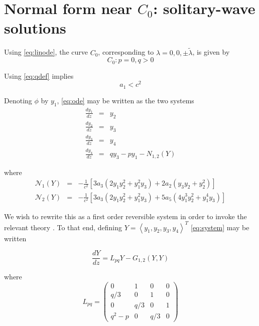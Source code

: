 \section{Normal form near $C_0$: solitary-wave solutions}

Using \eqref{eq:linode}, the curve $C_0$, corresponding to $\lambda = 0,0,\pm \tilde{ \lambda } $, is given by
\begin{equation}
C_0: { p=0, q > 0 }
\end{equation}

Using \eqref{eq:qdef} implies
\begin{equation}
a_1 < c^2 
\end{equation}

Denoting $\phi$ by $y_1$, \eqref{eq:ode} may be written as the two systems
\begin{subequations}\label{eq:system}
\begin{eqnarray}
\frac{d y_1 }{d z} &=& y_2 \\
\frac{d y_2 }{d z} &=& y_3 \\
\frac{d y_3 }{d z} &=& y_4 \\
\frac{d y_4 }{d z} &=& q y_3 - p y_1 - N_{1,2}(Y)
\end{eqnarray}
\end{subequations}

where
\begin{subequations}
\begin{eqnarray}
\mathcal{N}_1\left(Y\right) &=& - \frac{1}{c^2}\left[  3 a_3 \left( 2 y_1 y_2^2 + y_1^2 y_3 \right) + 2 a_2\left( y_3 y_2 + y_2^2\right) \right] \\
\mathcal{N}_2\left(Y\right) &=& - \frac{1}{c^2}\left[ 3 a_3 \left( 2 y_1 y_2^2 + y_1^2 y_3\right) + 5 a_5 \left( 4 y_1^3 y_2^2 + y_1^4 y_3 \right) \right]
\end{eqnarray}
\end{subequations}

We wish to rewrite this as a first order reversible system in order to invoke the relevant theory \cite{IA}. 
To that end, defining  $Y=\left<y_1,y_2,y_3,y_4\right>^T$ \eqref{eq:system} may be written 

\begin{equation}\label{eq:bilinear}
\frac{ dY }{ dz } = L_{pq} Y - G_{1,2}(Y,Y)
\end{equation}

where 
\begin{equation}
L_{pq} = \left( 
\begin{array}{cccc}
0&1&0&0\\
q/3&0&1&0\\
0&q/3&0&1\\
q^2 - p &0&q/3&0 \end{array} \right)
 \end{equation}

